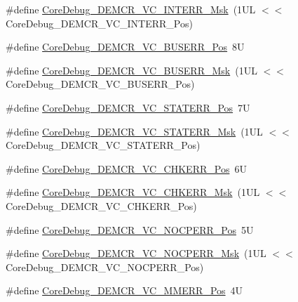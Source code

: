 \begin{DoxyCompactItemize}
\item 
\#define \hyperlink{group___c_m_s_i_s___core_debug_gad6815d8e3df302d2f0ff2c2c734ed29a}{Core\+Debug\+\_\+\+D\+E\+M\+C\+R\+\_\+\+V\+C\+\_\+\+I\+N\+T\+E\+R\+R\+\_\+\+Msk}~(1\+U\+L $<$$<$ Core\+Debug\+\_\+\+D\+E\+M\+C\+R\+\_\+\+V\+C\+\_\+\+I\+N\+T\+E\+R\+R\+\_\+\+Pos)
\item 
\#define \hyperlink{group___c_m_s_i_s___core_debug_gab8e3d8f0f9590a51bbf10f6da3ad6933}{Core\+Debug\+\_\+\+D\+E\+M\+C\+R\+\_\+\+V\+C\+\_\+\+B\+U\+S\+E\+R\+R\+\_\+\+Pos}~8U
\item 
\#define \hyperlink{group___c_m_s_i_s___core_debug_ga9d29546aefe3ca8662a7fe48dd4a5b2b}{Core\+Debug\+\_\+\+D\+E\+M\+C\+R\+\_\+\+V\+C\+\_\+\+B\+U\+S\+E\+R\+R\+\_\+\+Msk}~(1\+U\+L $<$$<$ Core\+Debug\+\_\+\+D\+E\+M\+C\+R\+\_\+\+V\+C\+\_\+\+B\+U\+S\+E\+R\+R\+\_\+\+Pos)
\item 
\#define \hyperlink{group___c_m_s_i_s___core_debug_ga16f0d3d2ce1e1e8cd762d938ac56c4ac}{Core\+Debug\+\_\+\+D\+E\+M\+C\+R\+\_\+\+V\+C\+\_\+\+S\+T\+A\+T\+E\+R\+R\+\_\+\+Pos}~7U
\item 
\#define \hyperlink{group___c_m_s_i_s___core_debug_gaa38b947d77672c48bba1280c0a642e19}{Core\+Debug\+\_\+\+D\+E\+M\+C\+R\+\_\+\+V\+C\+\_\+\+S\+T\+A\+T\+E\+R\+R\+\_\+\+Msk}~(1\+U\+L $<$$<$ Core\+Debug\+\_\+\+D\+E\+M\+C\+R\+\_\+\+V\+C\+\_\+\+S\+T\+A\+T\+E\+R\+R\+\_\+\+Pos)
\item 
\#define \hyperlink{group___c_m_s_i_s___core_debug_ga10fc7c53bca904c128bc8e1a03072d50}{Core\+Debug\+\_\+\+D\+E\+M\+C\+R\+\_\+\+V\+C\+\_\+\+C\+H\+K\+E\+R\+R\+\_\+\+Pos}~6U
\item 
\#define \hyperlink{group___c_m_s_i_s___core_debug_ga2f98b461d19746ab2febfddebb73da6f}{Core\+Debug\+\_\+\+D\+E\+M\+C\+R\+\_\+\+V\+C\+\_\+\+C\+H\+K\+E\+R\+R\+\_\+\+Msk}~(1\+U\+L $<$$<$ Core\+Debug\+\_\+\+D\+E\+M\+C\+R\+\_\+\+V\+C\+\_\+\+C\+H\+K\+E\+R\+R\+\_\+\+Pos)
\item 
\#define \hyperlink{group___c_m_s_i_s___core_debug_gac9d13eb2add61f610d5ced1f7ad2adf8}{Core\+Debug\+\_\+\+D\+E\+M\+C\+R\+\_\+\+V\+C\+\_\+\+N\+O\+C\+P\+E\+R\+R\+\_\+\+Pos}~5U
\item 
\#define \hyperlink{group___c_m_s_i_s___core_debug_ga03ee58b1b02fdbf21612809034562f1c}{Core\+Debug\+\_\+\+D\+E\+M\+C\+R\+\_\+\+V\+C\+\_\+\+N\+O\+C\+P\+E\+R\+R\+\_\+\+Msk}~(1\+U\+L $<$$<$ Core\+Debug\+\_\+\+D\+E\+M\+C\+R\+\_\+\+V\+C\+\_\+\+N\+O\+C\+P\+E\+R\+R\+\_\+\+Pos)
\item 
\#define \hyperlink{group___c_m_s_i_s___core_debug_ga444454f7c7748e76cd76c3809c887c41}{Core\+Debug\+\_\+\+D\+E\+M\+C\+R\+\_\+\+V\+C\+\_\+\+M\+M\+E\+R\+R\+\_\+\+Pos}~4U
$$
\end{DoxyCompactItemize}
